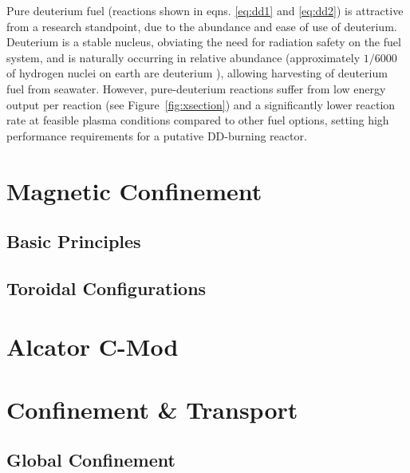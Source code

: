 Pure deuterium fuel (reactions shown in eqns. \ref{eq:dd1} and \ref{eq:dd2}) is attractive from a research standpoint, due to the abundance and ease of use of deuterium.  Deuterium is a stable nucleus, obviating the need for radiation safety on the fuel system, and is naturally occurring in relative abundance (approximately $1/6000$ of hydrogen nuclei on earth are deuterium ), allowing harvesting of deuterium fuel from seawater.  However, pure-deuterium reactions suffer from low energy output per reaction (see Figure~\ref{fig:xsection}) and a significantly lower reaction rate at feasible plasma conditions compared to other fuel options, setting high performance requirements for a putative DD-burning reactor.




\section{Magnetic Confinement}\label{sec:intro_magnetic}

\subsection{Basic Principles}\label{subsec:intro_basic}

\subsection{Toroidal Configurations}\label{subsec:intro_toroidal}


\section{Alcator C-Mod}\label{sec:intro_cmod}


\section{Confinement \& Transport}\label{sec:intro_confinement}

\subsection{Global Confinement}\label{subsec:intro_global}

